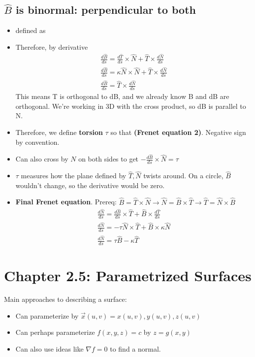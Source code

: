 \documentclass[11pt, oneside]{article}   	%
\begin{document}
\subsection{$\hat{B}$ is binormal: perpendicular to both}
\begin{itemize}
\item defined as 
\item Therefore, by derivative 
\begin{align}
\frac{d\hat{B}}{ds} = \frac{d\hat{T}}{ds} \times \hat{N} +  \hat{T} \times \frac{d\hat{N}}{ds}\\ 
\frac{d\hat{B}}{ds} = \kappa \hat{N} \times \hat{N}  +  \hat{T} \times \frac{d\hat{N}}{ds}\\ 
\frac{d\hat{B}}{ds} =  \hat{T} \times \frac{d\hat{N}}{ds}
\end{align}
This means T is orthogonal to dB, and we already know B and dB are orthogonal.
We're working in 3D with the cross product, so dB is parallel to N.
\item Therefore, we define \textbf{torsion} $\tau$ so that \textbf{(Frenet equation 2)}.  Negative sign by convention.
\item Can also cross by $N$ on both sides to get $- \frac{d\hat{B}}{ds}  \times \hat{N} = \tau $ 
\item $\tau$ measures how the plane defined by $\hat{T}, \hat{N}$ twists around.  On a circle, $\hat{B}$ wouldn't change, so the derivative would be zero.
\item \textbf{Final Frenet equation}.  Prereq: $\hat{B} = \hat{T} \times \hat{N} \rightarrow \hat{N} = \hat{B} \times \hat{T} \rightarrow \hat{T} = \hat{N} \times \hat{B}$
\begin{align}
\frac{d\hat{N}}{ds} = \frac{d\hat{B}}{ds} \times \hat{T} +   \hat{B} \times  \frac{d\hat{T}}{ds} \\
\frac{d\hat{N}}{ds} = -\tau \hat{N} \times \hat{T} + \hat{B} \times \kappa \hat{N} \\ 
\frac{d\hat{N}}{ds}  = \tau \hat{B} - \kappa \hat{T}
\end{align}

\end{itemize}

\section{Chapter 2.5: Parametrized Surfaces}

Main approaches to describing a surface:
\begin{itemize}
\item Can parameterize by $\vec{x}(u,v) = x(u,v), y(u,v), z(u,v)$
\item Can perhaps parameterize $f(x,y,z) = c$ by $z = g(x,y)$
\item Can also use ideas like $\nabla f = 0$ to find a normal.
\end{itemize}
\end{document}
